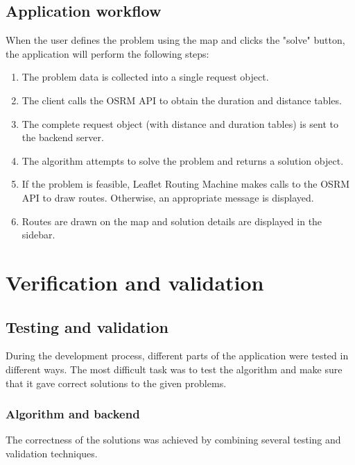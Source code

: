 \documentclass[a4paper,twoside,12pt]{book}
\begin{document}
\section{Application workflow}

When the user defines the problem using the map and clicks the "solve" button, the application will perform the following steps: 

\begin{enumerate}
    \item The problem data is collected into a single request object.
    \item  The client calls the OSRM API to obtain the duration and distance tables.
    \item The complete request object (with distance and duration tables) is sent to the backend server.
    \item The algorithm attempts to solve the problem and returns a solution object.
    \item If the problem is feasible, Leaflet Routing Machine makes calls to the OSRM API to draw routes. Otherwise, an appropriate message is displayed.
    \item Routes are drawn on the map and solution details are displayed in the sidebar.
\end{enumerate}


\chapter{Verification and validation}
\section{Testing and validation}
During the development process, different parts of the application were tested in different ways. The most difficult task was to test the algorithm and make sure that it gave correct solutions to the given problems. 
\subsection{Algorithm and backend}
The correctness of the solutions was achieved by combining several testing and validation techniques.
\end{document}
